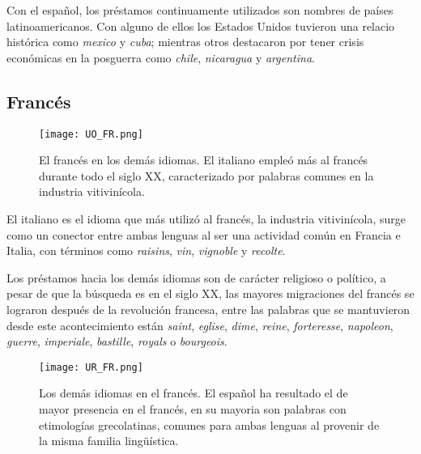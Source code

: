 Con el español, los préstamos continuamente utilizados son nombres de países latinoamericanos. Con alguno de ellos los Estados Unidos tuvieron una relacio histórica como \textit{mexico} y \textit{cuba}; mientras otros destacaron por tener crisis económicas en la posguerra como \textit{chile}, \textit{nicaragua} y \textit{argentina}.  


 





\subsection{Francés} %

\begin{figure}[h!]
	\centering
	\texttt{[image: UO\_FR.png]}
	\caption{El francés en los demás idiomas. El italiano empleó más al francés durante todo el siglo XX, caracterizado por palabras comunes en la industria vitivinícola.}
	\label{fig.UO_FR}
\end{figure}


El italiano es el idioma que más utilizó al francés,  la industria vitivinícola, surge como un conector entre ambas lenguas al ser una actividad común en Francia e Italia, con términos como \textit{raisins}, \textit{vin}, \textit{vignoble} y \textit{recolte}.

Los préstamos hacia los demás idiomas son de carácter religioso o político, a pesar de que la búsqueda es en el siglo XX, las mayores migraciones del francés se lograron después de la revolución francesa, entre las palabras que se mantuvieron desde este acontecimiento están  \textit{saint}, \textit{eglise}, \textit{dime}, \textit{reine}, \textit{forteresse}, \textit{napoleon}, \textit{guerre}, \textit{imperiale}, \textit{bastille}, \textit{royals} o \textit{bourgeois}.  


\begin{figure}[h!]
	\centering
	\texttt{[image: UR\_FR.png]}
	\caption{Los demás idiomas en el francés. El español ha resultado el de mayor presencia en el francés, en su mayoria son palabras con etimologías grecolatinas, comunes para ambas lenguas al provenir de la misma familia lingüística.}
	\label{fig.UR_FR}
\end{figure}
		
